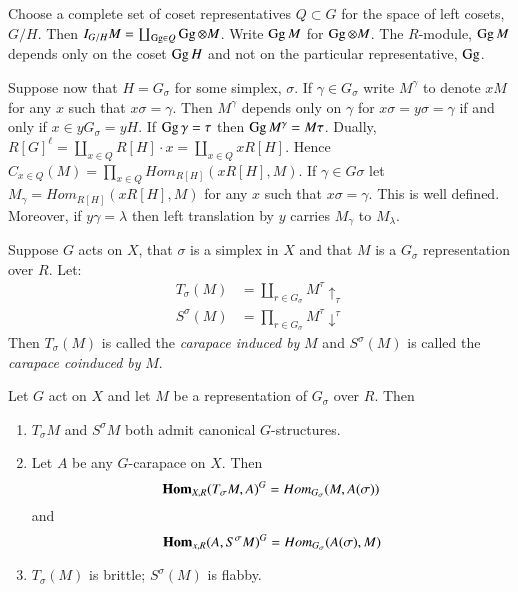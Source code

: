 Choose a complete set of coset representatives $Q\subset G$ for the space of left cosets, $G/H$. Then $I_{G/H}M =\coprod_{\operatorname{Gg} \in Q}\operatorname{Gg} \otimes M$. Write $\operatorname{Gg} M$ for $\operatorname{Gg} \otimes M$. The $R$-module, $\operatorname{Gg} M$ depends only on the coset $\operatorname{Gg} H$ and not on the particular representative, $\operatorname{Gg}$.

Suppose now that $H= G_{\sigma}$ for some simplex, $\sigma$. If $\gamma \in G_{\sigma}$ write $M^{\gamma}$ to denote $xM$ for any $x$ such that $x\sigma =\gamma$. Then $M^{\gamma}$ depends only on $\gamma$ for $x\sigma = y\sigma = \gamma$ if and only if $x \in yG_{\sigma}=yH$. If $\operatorname{Gg} \gamma =\tau$ then $\operatorname{Gg} M^{\gamma} = M\tau$. Dually, $R[G]^{\ell} = \coprod_{x\in Q}R[H] \cdot x =\coprod_{x\in Q}xR[H]$. Hence $C_{x\in Q}(M) = \prod_{x\in Q}Hom_{R[H]}(xR[H], M)$. If $\gamma \in G\sigma$ let $M_{\gamma} =Hom_{R[H]}(xR[H], M)$ for any $x$ such that $x\sigma = \gamma$. This is well defined. Moreover, if $y\gamma = \lambda$ then left translation by $y$ carries $M_{\gamma}$ to $M_{\lambda}$.

\begin{definition}\label{chap6-definition-9.1}
Suppose $G$ acts on $X$, that $\sigma$ is a simplex in $X$ and that $M$ is a $G_{\sigma}$ representation over $R$. Let:
\begin{equation*}
\begin{aligned}\label{chap6-eq-9.2}
T_{\sigma}(M) &= \coprod_{r\in G_{\sigma}}M^{\tau}\uparrow_{\tau}\\
S^{\sigma}(M) &= \prod_{r\in G_{\sigma}}M^{\tau}\downarrow^{\tau}
\end{aligned}\tag{9.2}
\end{equation*}
Then $T_{\sigma}(M)$ is called the \textit{carapace induced by} $M$ and $S^{\sigma}(M)$ is called the \textit{carapace coinduced by} $M$.
\end{definition}   

\setcounter{definition}{2}
\begin{secprop}\label{chap6-proposition-9.3}
Let $G$ act on $X$ and let $M$ be a representation of $G_{\sigma}$ over $R$. Then
\begin{enumerate}[(1)]
\item $T_{\sigma}M$ and $S^{\sigma}M$ both admit canonical $G$-structures.\label{chap6-proposition9.3-enum-1}
\item Let $A$ be any $G$-carapace on $X$. Then \label{chap6-proposition9.3-enum-2}
    $$
    \operatorname{\mathbf{Hom}}_{X,R}(T_{\sigma}M, A)^{G} = Hom_{G_{\sigma}}(M, A(\sigma))
    $$
    and
    $$
    \operatorname{\mathbf{Hom}}_{x, R}(A, S^{\sigma} M)^{G} = Hom_{G_{\sigma}}(A(\sigma), M)
    $$
\item $T_{\sigma}(M)$ is brittle; $S^{\sigma}(M)$ is flabby. \label{chap6-proposition9.3-enum-3}
\end{enumerate}
\end{secprop}

